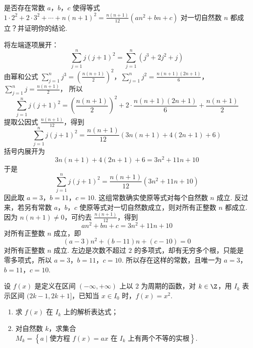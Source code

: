 \documentclass[UTF8,a4paper,oneside,11pt]{ctexbook}
\begin{document}
\begin{problem}
是否存在常数 \(a\)，\(b\)，\(c\) 使得等式 \(1 \cdot 2^2 + 2 \cdot 3^2 + \cdots + n(n + 1)^2 = \frac{n(n + 1)}{12}(an^2 + bn + c)\) 对一切自然数 \(n\) 都成立？并证明你的结论.
\end{problem}

\begin{solution}
将左端逐项展开：
\[
\sum_{j=1}^{n}j(j+1)^2=\sum_{j=1}^{n}(j^3+2j^2+j)
\]
由幂和公式
\(\sum_{j=1}^{n}j^3=\left(\frac{n(n+1)}{2}\right)^2\)，\(\sum_{j=1}^{n}j^2=\frac{n(n+1)(2n+1)}{6}\)，\(\sum_{j=1}^{n}j=\frac{n(n+1)}{2}\)，
所以
\[
\sum_{j=1}^{n}j(j+1)^2=\left(\frac{n(n+1)}{2}\right)^2+2\cdot\frac{n(n+1)(2n+1)}{6}+\frac{n(n+1)}{2}
\]
提取公因式 \(\frac{n(n+1)}{12}\)，得到
\[
\sum_{j=1}^{n}j(j+1)^2=\frac{n(n+1)}{12}\left(3n(n+1)+4(2n+1)+6\right)
\]
括号内展开为
\[
3n(n+1)+4(2n+1)+6=3n^2+11n+10
\]
于是
\[
\sum_{j=1}^{n}j(j+1)^2=\frac{n(n+1)}{12}\left(3n^2+11n+10\right)
\]
因此取
\(a=3\)，\(b=11\)，\(c=10\).
这组常数确实使原等式对每个自然数 \(n\) 成立. 反过来，若另有常数 \(a\)，\(b\)，\(c\) 使原等式对一切自然数成立，则对所有正整数 \(n\) 都成立. 因为 \(n(n+1)\neq0\)，可约去 \(\frac{n(n+1)}{12}\)，得到
\[
an^2+bn+c=3n^2+11n+10
\]
对所有正整数 \(n\) 成立，即
\[
(a-3)n^2+(b-11)n+(c-10)=0
\]
对所有正整数 \(n\) 成立. 左边是次数不超过 \(2\) 的多项式，却有无穷多个根，只能是零多项式，所以
\(a=3\)，\(b=11\)，\(c=10\).
所以存在这样的常数，且唯一为 \(a=3\)，\(b=11\)，\(c=10\).
\end{solution}

\begin{problem}
设 \(f(x)\) 是定义在区间 \((-\infty, +\infty)\) 上以 \(2\) 为周期的函数，对 \(k \in \Z\)，用 \(I_k\) 表示区间 \((2k - 1, 2k + 1]\)，已知当 \(x \in I_0\) 时，\(f(x) = x^2\).
\begin{enumerate}
\item 求 \(f(x)\) 在 \(I_k\) 上的解析表达式；
\item 对自然数 \(k\)，求集合 \(M_k = \left\{ a \mid \text{使方程 } f(x) = ax \text{ 在 } I_k \text{ 上有两个不等的实根} \right\}\).
\end{enumerate}
\end{problem}
\end{document}

